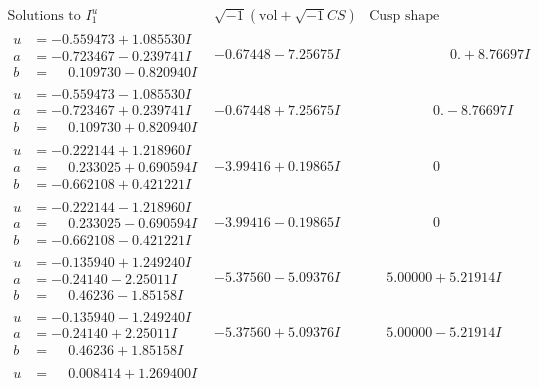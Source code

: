 \documentclass[1p]{elsarticle_modified}
\theoremstyle{definition}
\newcommand{\I}{\sqrt{-1}}
\begin{document}
$$\begin{array}{c|c|c}
\text{Solutions to }I^u_{1}& \I (\text{vol} + \sqrt{-1}CS) & \text{Cusp shape}\\
 \hline 
\begin{aligned}
u &= -0.559473 + 1.085530 I \\
a &= -0.723467 - 0.239741 I \\
b &= \phantom{-}0.109730 - 0.820940 I\end{aligned}
 & -0.67448 - 7.25675 I & \phantom{-0.000000 -}0. + 8.76697 I \\ \hline\begin{aligned}
u &= -0.559473 - 1.085530 I \\
a &= -0.723467 + 0.239741 I \\
b &= \phantom{-}0.109730 + 0.820940 I\end{aligned}
 & -0.67448 + 7.25675 I & \phantom{-0.000000 } 0. - 8.76697 I \\ \hline\begin{aligned}
u &= -0.222144 + 1.218960 I \\
a &= \phantom{-}0.233025 + 0.690594 I \\
b &= -0.662108 + 0.421221 I\end{aligned}
 & -3.99416 + 0.19865 I & \phantom{-0.000000 } 0 \\ \hline\begin{aligned}
u &= -0.222144 - 1.218960 I \\
a &= \phantom{-}0.233025 - 0.690594 I \\
b &= -0.662108 - 0.421221 I\end{aligned}
 & -3.99416 - 0.19865 I & \phantom{-0.000000 } 0 \\ \hline\begin{aligned}
u &= -0.135940 + 1.249240 I \\
a &= -0.24140 - 2.25011 I \\
b &= \phantom{-}0.46236 - 1.85158 I\end{aligned}
 & -5.37560 - 5.09376 I & \phantom{-}5.00000 + 5.21914 I \\ \hline\begin{aligned}
u &= -0.135940 - 1.249240 I \\
a &= -0.24140 + 2.25011 I \\
b &= \phantom{-}0.46236 + 1.85158 I\end{aligned}
 & -5.37560 + 5.09376 I & \phantom{-}5.00000 - 5.21914 I \\ \hline\begin{aligned}
u &= \phantom{-}0.008414 + 1.269400 I \\

\end{aligned}
\end{array}$$
\end{document}
